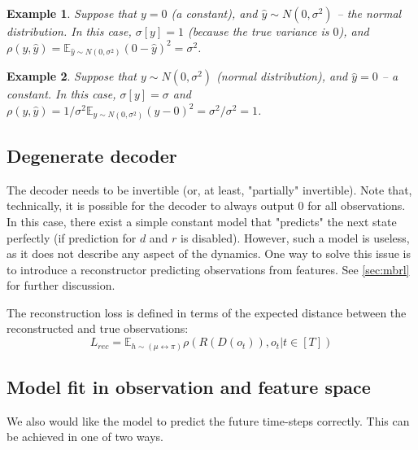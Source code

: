 \documentclass[a4paper,11pt,oneside]{report}
\newtheorem{example}{Example}[section]
\begin{document}
\begin{example}
    Suppose that $y=0$ (a constant), and $\hat{y}\sim N(0, \sigma^2)$ -- the normal distribution. In this case, $\sigma[y]=1$ (because the true variance is $0$), and $\rho(y, \hat{y})=\mathbb E_{\hat{y}\sim N(0, \sigma^2)}(0-\hat{y})^2=\sigma^2$.
\end{example}

\begin{example}
    Suppose that $y\sim N(0, \sigma^2)$ (normal distribution), and $\hat{y}=0$ -- a constant. In this case, $\sigma[y]=\sigma$ and $\rho(y, \hat{y})= 1/\sigma^2 \mathbb E_{y\sim N(0, \sigma^2)}(y-0)^2=\sigma^2/\sigma^2=1$.
\end{example}

\subsection{Degenerate decoder}
The decoder needs to be invertible (or, at least, "partially" invertible). Note that, technically, it is possible for the decoder to always output $0$ for all observations. In this case, there exist a simple constant model that "predicts" the next state perfectly (if prediction for $d$ and $r$ is disabled). However, such a model is useless, as it does not describe any aspect of the dynamics. One way to solve this issue is to introduce a reconstructor predicting observations from features. See \autoref{sec:mbrl} for further discussion.

The reconstruction loss is defined in terms of the expected distance between the reconstructed and true observations:
\begin{equation}
\label{eq:reconstruction_loss}
L_{rec}=\mathbb E_{h\sim (\mu\leftrightarrow \pi)}\rho(R(D(o_t)), o_t|t\in [T])
\end{equation}

\subsection{Model fit in observation and feature space}
We also would like the model to predict the future time-steps correctly. This can be achieved in one of two ways.
\end{document}
